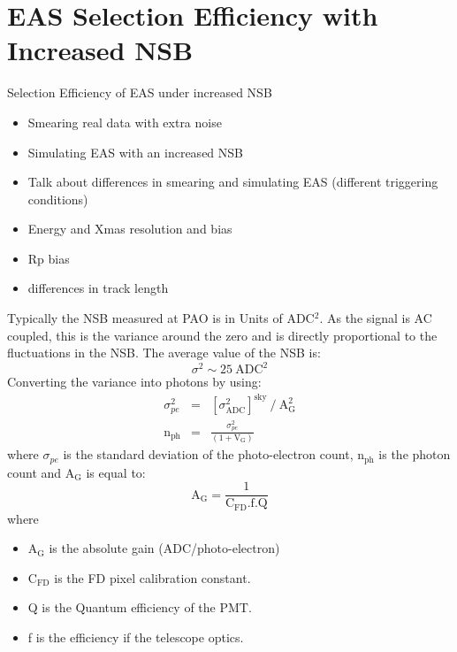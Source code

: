 \chapter{EAS Selection Efficiency with Increased NSB}\label{Ch:SelectEff}


Selection Efficiency of EAS under increased NSB
\begin{itemize}
\item Smearing real data with extra noise
\item Simulating EAS with an increased NSB
\item Talk about differences in smearing and simulating EAS (different triggering conditions)
\item Energy and Xmas resolution and bias
\item Rp bias
\item differences in track length
\end{itemize}



Typically the NSB measured at PAO is in Units of ADC$^2$. As the signal is AC coupled, this is the variance around the zero and is directly proportional to the fluctuations in the NSB. The average value of the NSB is:
\begin{equation}
\sigma^2 \sim 25 \ \mathrm{ADC}^2
\end{equation}
Converting the variance into photons by using:
\begin{eqnarray}
\sigma^2_{pe} &=& [\sigma^2_{\mathrm{ADC}}]^{\mathrm{sky}} \ / \ \mathrm{A}^2_{\mathrm{G}} \label{eq:simgaPE} \\
\mathrm{n}_{\mathrm{ph}} &=& \frac{\sigma^2_{pe}}{(1 + \mathrm{V}_{\mathrm{G}})} \label{eq:numPhoton}
\end{eqnarray}
where $\sigma_{pe}$ is the standard deviation of the photo-electron count, n$_{\mathrm{ph}}$ is the photon count and A$_{\mathrm{G}}$ is equal to:
\begin{equation}\label{eq:abs_gain}
\mathrm{A}_{\mathrm{G}} = \frac{1}{\mathrm{C}_{\mathrm{FD}}.\mathrm{f}.\mathrm{Q}}
\end{equation}
where
\begin{itemize}
\item[] A$_{\mathrm{G}}$ is the absolute gain (ADC/photo-electron)
\item[] $\mathrm{C}_{\mathrm{FD}}$ is the FD pixel calibration constant.
\item[] Q is the Quantum efficiency of the PMT.
\item[] f is the efficiency if the telescope optics.
\end{itemize}

